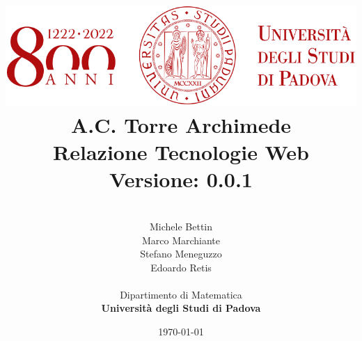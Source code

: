 \pagestyle{fancy}
    \fancyhf{}
    
    
\title{
    \includegraphics[scale=0.5]{images/logo.png} \\
    \vspace*{1in}
    {
        \Huge \textbf{A.C. Torre Archimede}}\\
        \vspace*{0.25in}
        \textbf{Relazione Tecnologie Web}\\
        \vspace{0.2in}
        \textbf{Versione: 0.0.1}\\
        \vspace{0.1in}
    }

\author{
    \begin{tabular}[t]{c@{}c}
        \hline
        \\
        Michele Bettin \\
        Marco Marchiante \\
        Stefano Meneguzzo\\
        Edoardo Retis\\
    \end{tabular}
    \vspace*{0.5in} \\
    Dipartimento di Matematica \\
    \textbf{Università degli Studi di Padova} \\
} 
\date{\today}


\setlength{\oddsidemargin}{0in} \setlength{\evensidemargin}{0in}
\setlength{\topmargin}{0in}     \setlength{\headsep}{.25in}
\setlength{\textwidth}{6.5in}   \setlength{\textheight}{8.5in}
\setlength{\parindent}{1cm}